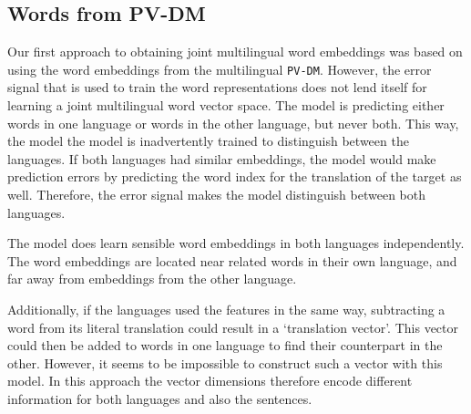 
% 
% 

\subsection{Words from PV-DM}
Our first approach to obtaining joint multilingual word embeddings was based on using the word embeddings from the multilingual \texttt{PV-DM}.
However, the error signal that is used to train the word representations does not lend itself for learning a joint multilingual word vector space.
The model is predicting either words in one language or words in the other language, but never both.
This way, the model the model is inadvertently trained to distinguish between the languages.
If both languages had similar embeddings, the model would make prediction errors by predicting the word index for the translation of the target as well.
Therefore, the error signal makes the model distinguish between both languages.

The model does learn sensible word embeddings in both languages independently.
The word embeddings are located near related words in their own language, and far away from embeddings from the other language.

Additionally, if the languages used the features in the same way, subtracting a word from its literal translation could result in a `translation vector'.
This vector could then be added to words in one language to find their counterpart in the other.
However, it seems to be impossible to construct such a vector with this model. 
In this approach the vector dimensions therefore encode different information for both languages and also the sentences.



